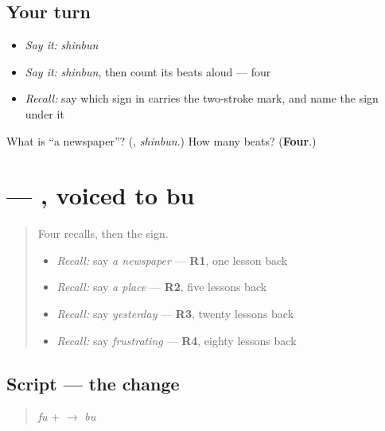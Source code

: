 \subsection*{Your turn}
\begin{itemize}
\raggedright
  \item \emph{Say it:} \emph{shinbun}
  \item \emph{Say it:} \emph{shinbun}, then count its beats aloud — four
  \item \emph{Recall:} say which sign in \textbf{} carries the two-stroke mark, and name the sign under it
\end{itemize}

\begin{tcolorbox}[breakable,colback=teal!4,colframe=teal!35!black,title={Before you move on}]
What is \textquotedblleft{}a newspaper\textquotedblright{}? (\textbf{}, \emph{shinbun}.) How many beats? (\textbf{Four}.)
\end{tcolorbox}
\section[\texorpdfstring{\ja{ぶ} (bu)}{ぶ (bu)}]{ — , voiced to bu}

\label{lesson:JA-W134-bu}



\begin{quote}
Four recalls, then the sign.

\begin{itemize}
\raggedright
  \item \emph{Recall:} say \emph{a newspaper} — \textbf{R1}, one lesson back
  \item \emph{Recall:} say \emph{a place} — \textbf{R2}, five lessons back
  \item \emph{Recall:} say \emph{yesterday} — \textbf{R3}, twenty lessons back
  \item \emph{Recall:} say \emph{frustrating} — \textbf{R4}, eighty lessons back
\end{itemize}
\end{quote}

\subsection*{Script — the change}

\begin{quote}
\textbf{} \emph{fu} + \textbf{} $\to$ \textbf{} \emph{bu}
\end{quote}

